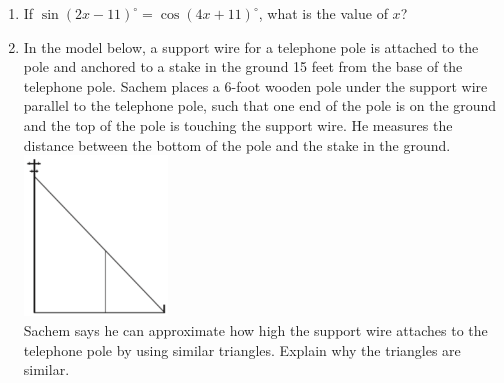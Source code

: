 \documentclass[12pt, twoside]{article}
\begin{document}
\begin{enumerate}
  \item If $\sin (2x-11)^\circ = \cos(4x+11)^\circ$, what is the value of $x$? \vspace{3cm}


  \item In the model below, a support wire for a telephone pole is attached to the pole and anchored to a stake in the ground 15 feet from the base of the telephone pole. Sachem places a 6-foot wooden pole under the support wire parallel to the telephone pole, such that one end of the pole is on the ground and the top of the pole is touching the support wire. He measures the distance between the bottom of the pole and the stake in the ground.\\[0.5cm]
    \includegraphics[width=0.3\textwidth]{pole_Aug2018-29.png}\\
  Sachem says he can approximate how high the support wire attaches to the telephone pole by using similar triangles. Explain why the triangles are similar.


  \end{enumerate}
  \newpage
  \setcounter{page}{1}
\end{document}
